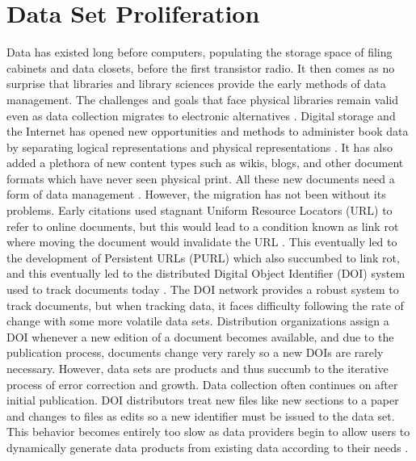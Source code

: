 \section{Data Set Proliferation}

Data has existed long before computers, populating the storage space of filing cabinets and data closets, before the first transistor radio.
It then comes as no surprise that libraries and library sciences provide the early methods of data management.
The challenges and goals that face physical libraries remain valid even as data collection migrates to electronic alternatives \cite{rohtua}.
Digital storage and the Internet has opened new opportunities and methods to administer book data by separating logical representations and physical representations \cite{Barkstrom_digitallibrary}.
It has also added a plethora of new content types such as wikis, blogs, and other document formats which have never seen physical print.
All these new documents need a form of data management \cite{Berberich:2007:TMT:1277741.1277831}.
However, the migration has not been without its problems.
Early citations used stagnant Uniform Resource Locators (URL) to refer to online documents, but this would lead to a condition known as link rot where moving the document would invalidate the URL \cite{Lyons2005}.
This eventually led to the development of Persistent URLs (PURL) which also succumbed to link rot, and this eventually led to the distributed Digital Object Identifier (DOI) system used to track documents today \cite{Duerr2011}.
The DOI network provides a robust system to track documents, but when tracking data, it faces difficulty following the rate of change with some more volatile data sets.
Distribution organizations assign a DOI whenever a new edition of a document becomes available, and due to the publication process, documents change very rarely so a new DOIs are rarely necessary.
However, data sets are products and thus succumb to the iterative process of error correction and growth.
Data collection often continues on after initial publication.
DOI distributors treat new files like new sections to a paper and changes to files as edits so a new identifier must be issued to the data set.
This behavior becomes entirely too slow as data providers begin to allow users to dynamically generate data products from existing data according to their needs \cite{Barkstrom2003}.

